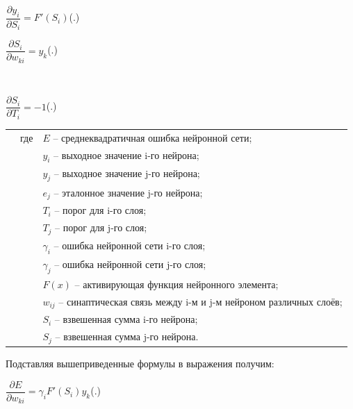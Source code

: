 {		\formulaspace \par \redline 
	$\dfrac{\partial y_i}{\partial S_i} =  F'(S_{i})$\hfill (\thechaptercntr .\theformulacntr) \redline
	\formulaspace \addtocounter{formulacntr}{1}
	
	\formulaspace \par \redline 
	$\dfrac{\partial S_i}{\partial w_{ki}} =  y_{k}$\hfill (\thechaptercntr .\theformulacntr) \redline
	\formulaspace \addtocounter{formulacntr}{1}\\
	
	\formulaspace \par \redline 
	$\dfrac{\partial S_i}{\partial T_{i}} = -1 $\hfill (\thechaptercntr .\theformulacntr) \redline
	\formulaspace \addtocounter{formulacntr}{1}
	
	\begin{tabular}{p{}p{}p{}}
		& где  & $E$ {--} среднеквадратичная ошибка нейронной сети; \\
		&      & $y_{i}$ {--} выходное значение i-го нейрона; \\
		&      & $y_{j}$ {--} выходное значение j-го нейрона; \\
		&      & $e_{j}$ {--} эталонное значение j-го нейрона; \\
		&      & $T_{i}$ {--} порог для i-го слоя; \\
		&      & $T_{j}$ {--} порог для j-го слоя; \\
		&      & $\gamma_{i}$ {--} ошибка нейронной сети i-го слоя; \\
		&      & $\gamma_{j}$ {--} ошибка нейронной сети j-го слоя; \\
		&      & $F(x)$ {--} активирующая функция нейронного элемента; \\
		&      & $w_{ij}$ {--} синаптическая связь между i-м и j-м нейроном различных слоёв; \\
		&      & $S_{i}$ {--} взвешенная сумма i-го нейрона; \\
		&      & $S_{j}$ {--} взвешенная сумма j-го нейрона. \\
	\end{tabular}
	
	\par \redline Подставляя вышеприведенные формулы в выражения получим:
	
	\formulaspace \par \redline 
	$\dfrac{\partial E}{\partial w_{ki}} =  \gamma_{i} F'(S_{i}) y_k$\hfill (\thechaptercntr .\theformulacntr) \redline
	\formulaspace \addtocounter{formulacntr}{1}
	
}
